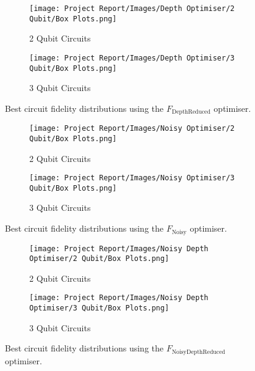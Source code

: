 \documentclass[11pt,a4paper]{article}
\begin{document}
\begin{figure}[H]
\centering
\begin{subfigure}{.5\textwidth}
  \centering
  \texttt{[image: Project Report/Images/Depth Optimiser/2 Qubit/Box Plots.png]}
  \caption{2 Qubit Circuits}
  \label{fig:depth_box_2q}
\end{subfigure}%
\begin{subfigure}{.5\textwidth}
  \centering
  \texttt{[image: Project Report/Images/Depth Optimiser/3 Qubit/Box Plots.png]}
  \caption{3 Qubit Circuits}
  \label{fig:depth_box_3q}
\end{subfigure}
\caption{Best circuit fidelity distributions using the $F_{\mathrm{DepthReduced}}$ optimiser.}
\label{fig:depth_box_plots}
\end{figure}

\begin{figure}[H]
\centering
\begin{subfigure}{.5\textwidth}
  \centering
  \texttt{[image: Project Report/Images/Noisy Optimiser/2 Qubit/Box Plots.png]}
  \caption{2 Qubit Circuits}
  \label{fig:noisy_box_2q}
\end{subfigure}%
\begin{subfigure}{.5\textwidth}
  \centering
  \texttt{[image: Project Report/Images/Noisy Optimiser/3 Qubit/Box Plots.png]}
  \caption{3 Qubit Circuits}
  \label{fig:noisy_box_3q}
\end{subfigure}
\caption{Best circuit fidelity distributions using the $F_{\mathrm{Noisy}}$ optimiser.}
\label{fig:noisy_box_plots}
\end{figure}

\begin{figure}[H]
\centering
\begin{subfigure}{.5\textwidth}
  \centering
  \texttt{[image: Project Report/Images/Noisy Depth Optimiser/2 Qubit/Box Plots.png]}
  \caption{2 Qubit Circuits}
  \label{fig:noisydepth_box_2q}
\end{subfigure}%
\begin{subfigure}{.5\textwidth}
  \centering
  \texttt{[image: Project Report/Images/Noisy Depth Optimiser/3 Qubit/Box Plots.png]}
  \caption{3 Qubit Circuits}
  \label{fig:noisydepth_box_3q}
\end{subfigure}
\caption{Best circuit fidelity distributions using the $F_{\mathrm{NoisyDepthReduced}}$ optimiser.}
\label{fig:noisydepth_box_plots}
\end{figure}
\end{document}

